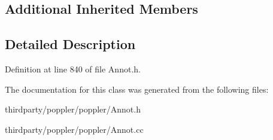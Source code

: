 \subsection*{Additional Inherited Members}


\subsection{Detailed Description}


Definition at line 840 of file Annot.\+h.



The documentation for this class was generated from the following files\+:\begin{DoxyCompactItemize}
\item 
thirdparty/poppler/poppler/Annot.\+h\item 
thirdparty/poppler/poppler/Annot.\+cc\end{DoxyCompactItemize}
